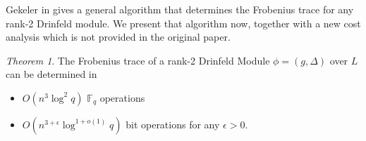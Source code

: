 \documentclass{jams-l}
\theoremstyle{remark}
\numberwithin{equation}{section}
\newtheorem{theorem}{Theorem}
\begin{document}



Gekeler in \cite{frobdist} gives a general algorithm that determines the Frobenius trace  for any rank-2 Drinfeld module. We present that algorithm now, together with a new cost analysis which is not provided in the original paper.



\begin{theorem}

The Frobenius trace of a rank-2 Drinfeld Module $\phi = (g, \Delta)$ over $L$ can be determined in

\begin{itemize}
\item $O(n^3 \log^2 q)$ $\mathbb{F}_q$ operations
\item $O(n^{3+\epsilon} \log^{1+o(1)} q)$ bit operations for any $\epsilon > 0$.
\end{itemize}

\end{theorem}
\end{document}
